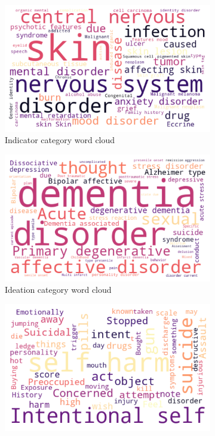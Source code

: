 \documentclass[sn-mathphys,Numbered]{sn-jnl}%
\theoremstyle{thmstyleone}%
\theoremstyle{thmstyletwo}%
\theoremstyle{thmstylethree}%
\begin{document}
\begin{figure}[h!]
\centering
\begin{subfigure}{0.45\textwidth}
    \includegraphics[width=\textwidth]{indicator_word_cloud.png}
    \caption{Indicator category word cloud}
    \label{redditdist}
\end{subfigure}
\hfill
\begin{subfigure}{0.45\textwidth}
    \includegraphics[width=\textwidth]{Ideation_word_cloud.png}
    \caption{Ideation category word cloud}
    \label{twitterdist}
\end{subfigure}      
\centering
\begin{subfigure}{0.45\textwidth}
    \includegraphics[width=\textwidth]{Behavior_word_cloud.png}

\end{subfigure}
\end{figure}
\end{document}
